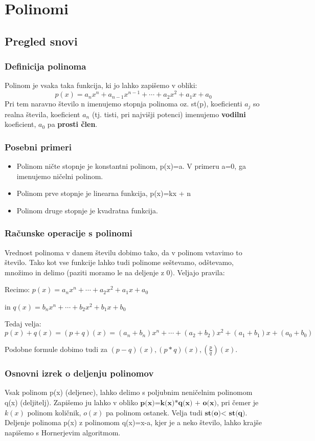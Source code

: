 \chapter{Polinomi}
\label{cha:polinomi}

\section{Pregled snovi}
\label{sec:polinomi-pregled-snovi}


\subsection{Definicija polinoma}
Polinom je vsaka taka funkcija, ki jo lahko zapišemo v obliki:
\[
p(x)=a_nx^n + a_{n-1}x^{n-1}+ \cdots + a_2x^2 + a_1 x + a_0
\]
Pri tem naravno število n imenujemo stopnja polinoma oz. st(p), koeficienti $ a_j$ so realna števila, koeficient $ a_n$ (tj. tisti, pri najvišji potenci) imenujemo \textbf{vodilni} koeficient, $ a_0$ pa \textbf{prosti člen}.
\subsection{Posebni primeri}
\begin{itemize}
\item Polinom ničte stopnje je konstantni polinom, p(x)=a. V primeru a=0, ga imenujemo ničelni polinom.
\item Polinom prve stopnje je linearna funkcija, p(x)=kx + n
\item Polinom druge stopnje je kvadratna funkcija.
\end{itemize}
\subsection{Računske operacije s polinomi}
Vrednost polinoma v danem številu dobimo tako, da v polinom vstavimo to število. 
Tako kot vse funkcije lahko tudi polinome seštevamo, odštevamo, množimo in delimo (paziti moramo le na deljenje z 0). Veljajo pravila:

Recimo: 
$ p(x)=a_nx^n + \cdots + a_2x^2 + a_1 x + a_0$ 

 in  
$ q(x)=b_nx^n + \cdots + b_2x^2 + b_1 x + b_0$ 

Tedaj velja:
$p(x) + q(x) = (p+q)(x) =(a_n + b_n)x^n +\cdots +(a_2 + b_2)x^2 +( a_1 + b_1) x + (a_0+b_0)$

Podobne formule dobimo tudi za $(p-q)(x), (p*q)(x), (\frac{p}{q})(x)$.
\subsection{Osnovni izrek o deljenju polinomov}
Vsak polinom p(x) (deljenec), lahko delimo s poljubnim neničelnim polinomom q(x) (deljitelj). Zapišemo ju lahko v obliko $\textbf{p(x)=k(x)*q(x) + o(x)}$, pri čemer je $k(x)$ polinom količnik, $o(x)$ pa polinom ostanek. Velja tudi $\textbf{st(o)< st(q)}$. Deljenje polinoma p(x) z polinomom q(x)=x-a, kjer je a neko število, lahko krajše napišemo s Hornerjevim algoritmom.

